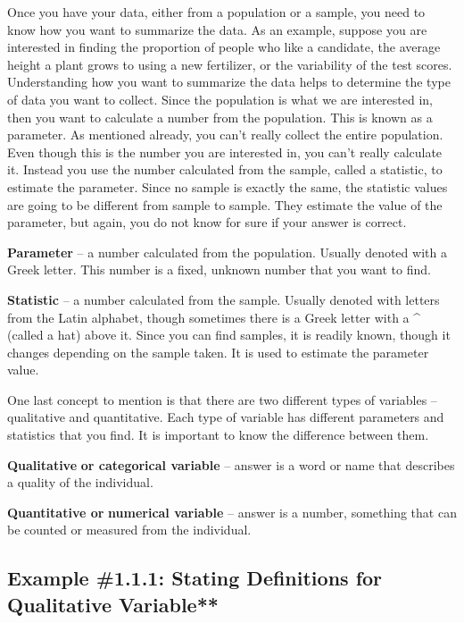 \documentclass[]{book}
\begin{document}
Once you have your data, either from a population or a sample, you need to know how you want to summarize the data. As an example, suppose you are interested in finding the proportion of people who like a candidate, the average height a plant grows to using a new fertilizer, or the variability of the test scores. Understanding how you want to summarize the data helps to determine the type of data you want to collect. Since the population is what we are interested in, then you want to calculate a number from the population. This is known as a parameter. As mentioned already, you can't really collect the entire population. Even though this is the number you are interested in, you can't really calculate it. Instead you use the number calculated from the sample, called a statistic, to estimate the parameter. Since no sample is exactly the same, the statistic values are going to be different from sample to sample. They estimate the value of the parameter, but again, you do not know for sure if your answer is correct.

\textbf{Parameter} -- a number calculated from the population. Usually denoted with a Greek letter. This number is a fixed, unknown number that you want to find.

\textbf{Statistic} -- a number calculated from the sample. Usually denoted with letters from the Latin alphabet, though sometimes there is a Greek letter with a \^{} (called a hat) above it. Since you can find samples, it is readily known, though it changes depending on the sample taken. It is used to estimate the parameter value.

One last concept to mention is that there are two different types of variables -- qualitative and quantitative. Each type of variable has different parameters and statistics that you find. It is important to know the difference between them.

\textbf{Qualitative} \textbf{or categorical variable} -- answer is a word or name that describes a quality of the individual.

\textbf{Quantitative or} \textbf{numerical variable} -- answer is a number, something that can be counted or measured from the individual.

\hypertarget{example-1.1.1-stating-definitions-for-qualitative-variable}{%
\subsection{Example \#1.1.1: Stating Definitions for Qualitative Variable**}\label{example-1.1.1-stating-definitions-for-qualitative-variable}}
\end{document}
